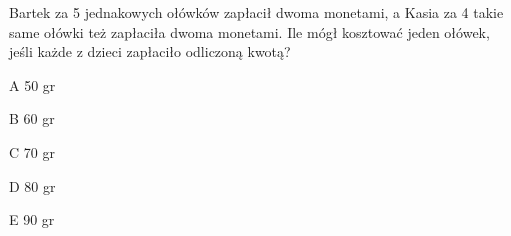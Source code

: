 \begin{tresc}
Bartek za 5 jednakowych ołówków zapłacił dwoma monetami, a Kasia za 4 takie same ołówki też zapłaciła dwoma monetami. Ile mógł kosztować jeden ołówek, jeśli każde z dzieci zapłaciło odliczoną kwotą?
\end{tresc}
\begin{wariant}{A} 50 gr \end{wariant}
\begin{wariant}{B} 60 gr \end{wariant}
\begin{wariant}{C} 70 gr \end{wariant}
\begin{wariant}{D} 80 gr \end{wariant}
\begin{wariant}{E} 90 gr \end{wariant}
